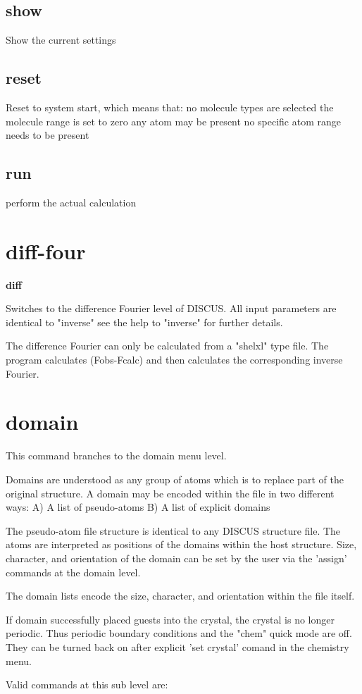 \subsection*{show}
\par
Show the current settings 
\subsection*{reset}
\par
Reset to system start, which means that: 
no molecule types are selected 
the molecule range is set to zero 
any atom may be present 
no specific atom range needs to be present 
\subsection*{run}
\par
perform the actual calculation 
\section{diff-four}
{\bf diff \par }
\par
\vspace{3pt}
Switches to the difference Fourier level of DISCUS. 
All input parameters are identical to "inverse" see the help to 
"inverse" for further details. 
\par
The difference Fourier can only be calculated from a "shelxl" type 
file. The program calculates (Fobs-Fcalc) and then calculates the 
corresponding inverse Fourier. 
\section{domain}
\par
This command branches to the domain menu level. 
\par
Domains are understood as any group of atoms which is to replace 
part of the original structure. A domain may be encoded within the 
file in two different ways: 
A) A list of pseudo-atoms 
B) A list of explicit domains 
\par
The pseudo-atom file structure is identical to any DISCUS structure 
file. The atoms are interpreted as positions of the domains within 
the host structure. Size, character, and orientation of the domain 
can be set by the user via the 'assign' commands at the domain level. 
\par
The domain lists encode the size, character, and orientation within 
the file itself. 
\par
If domain successfully placed guests into the crystal, the crystal 
is no longer periodic. Thus periodic boundary conditions and 
the "chem" quick mode are off. They can be turned back on after 
explicit 'set crystal' comand in the chemistry menu. 
\par
Valid commands at this sub level are: 
